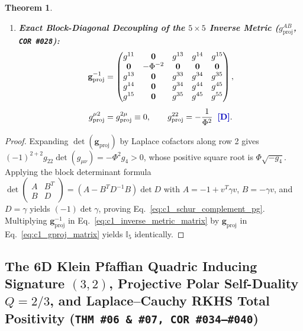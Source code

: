 \documentclass[11pt,a4paper]{article}
\newcommand{\catD}{\text{\textbf{\textcolor{blue!75!black}{[D]}}}}
\theoremstyle{definition}
\theoremstyle{plain}
\newtheorem{theorem}[axiom]{Theorem}
\theoremstyle{remark}
\begin{document}
\begin{theorem}
\begin{enumerate}[label=(\roman*)]
\begin{align}
  \sqrt{\left|\det\!\left(\mathbf{g}_{\mathrm{proj}}^{(\mathrm{PG})}\right)\right|} = \Phi\sqrt{\det(\gamma_{ij})} \;\;\catD. \label{eq:c1_schur_complement_pg}
  \end{align}
  \item \textbf{Exact Block-Diagonal Decoupling of the $5\times 5$ Inverse Metric ($g^{AB}_{\mathrm{proj}}$, \texttt{COR~\#028}):}
  \begin{align}
  \mathbf{g}_{\mathrm{proj}}^{-1} &= \begin{pmatrix}
  g^{11} & \mathbf{0} & g^{13} & g^{14} & g^{15} \\
  \mathbf{0} & -\Phi^{-2} & \mathbf{0} & \mathbf{0} & \mathbf{0} \\
  g^{13} & \mathbf{0} & g^{33} & g^{34} & g^{35} \\
  g^{14} & \mathbf{0} & g^{34} & g^{44} & g^{45} \\
  g^{15} & \mathbf{0} & g^{35} & g^{45} & g^{55}
  \end{pmatrix}, \nonumber \\[4pt]
  g^{\mu 2}_{\mathrm{proj}} &= g^{2\mu}_{\mathrm{proj}} \equiv 0, \qquad
  g^{22}_{\mathrm{proj}} = -\frac{1}{\Phi^2} \;\;\catD. \label{eq:c1_inverse_metric_matrix}
  \end{align}
\end{enumerate}
\end{theorem}

\begin{proof}
Expanding $\det(\mathbf{g}_{\mathrm{proj}})$ by Laplace cofactors along row 2 gives $(-1)^{2+2}g_{22}\det(g_{\mu\nu}) = -\Phi^2 g_4 > 0$, whose positive square root is $\Phi\sqrt{-g_4}$. Applying the block determinant formula $\det\begin{pmatrix} A & B^T \\ B & D \end{pmatrix} = (A - B^T D^{-1} B)\det D$ with $A = -1 + v^T\gamma v$, $B = -\gamma v$, and $D = \gamma$ yields $(-1)\det\gamma$, proving Eq.~\eqref{eq:c1_schur_complement_pg}. Multiplying $\mathbf{g}_{\mathrm{proj}}^{-1}$ in Eq.~\eqref{eq:c1_inverse_metric_matrix} by $\mathbf{g}_{\mathrm{proj}}$ in Eq.~\eqref{eq:c1_gproj_matrix} yields $\mathbb{I}_5$ identically.
\end{proof}

\subsection{The 6D Klein Pfaffian Quadric Inducing Signature $(3,2)$, Projective Polar Self-Duality $Q = 2/3$, and Laplace--Cauchy RKHS Total Positivity (\texttt{THM~\#06 \& \#07, COR~\#034--\#040})}
\end{document}
